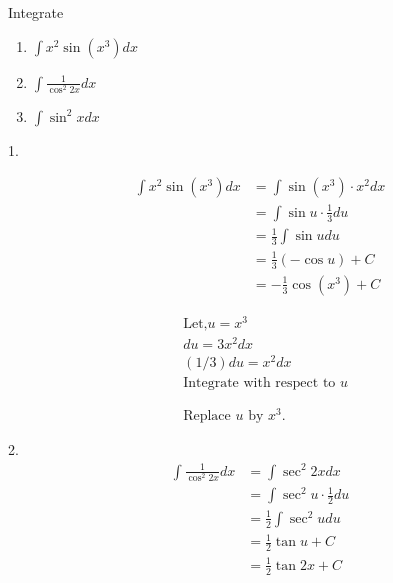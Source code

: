 \begin{exercise}
	Integrate 
	\begin{enumerate}
		\item $\int x^{2} \sin \left(x^{3}\right) d x$
		\item $ \int \frac{1}{\cos ^{2} 2 x} d x$
		\item $ \int \sin ^{2} x d x$
	\end{enumerate}
\end{exercise}
\begin{answer}1.\hspace{0.5cm}
	
\begin{minipage}{0.45\textwidth}
	\begin{align*}
	\int x^{2} \sin \left(x^{3}\right) d x &=\int \sin \left(x^{3}\right) \cdot x^{2} d x \\
	&=\int \sin u \cdot \frac{1}{3} d u \\
	&=\frac{1}{3} \int \sin u d u \\
	&=\frac{1}{3}(-\cos u)+C \\
	&=-\frac{1}{3} \cos \left(x^{3}\right)+C
	\end{align*}
\end{minipage}\hspace{2.5cm}
\begin{minipage}{0.35\textwidth}\hfill
		
	\begin{align*}
	&\text{Let,}u=x^{3}\\
	&d u=3 x^{2} d x \\
	&(1 / 3) d u=x^{2} d x\\
	&\text{Integrate}\text{ with respect to $u$}\\\\\\
	&\text{Replace $u$ by $x^{3}$.}
	\end{align*}
\end{minipage}
	

	\begin{minipage}{0.45\textwidth}
		2.\vspace{0.2cm}
		\begin{align*}
		\int \frac{1}{\cos ^{2} 2 x} d x &=\int \sec ^{2} 2 x d x \\
		&=\int \sec ^{2} u \cdot \frac{1}{2} d u \\
		&=\frac{1}{2} \int \sec ^{2} u d u \\
		&=\frac{1}{2} \tan u+C \\
		&=\frac{1}{2} \tan 2 x+C
		\end{align*}
	\end{minipage}\hspace{2.5cm}
\begin{minipage}{0.35\textwidth}\hfill
	

\end{minipage}
\end{answer}
